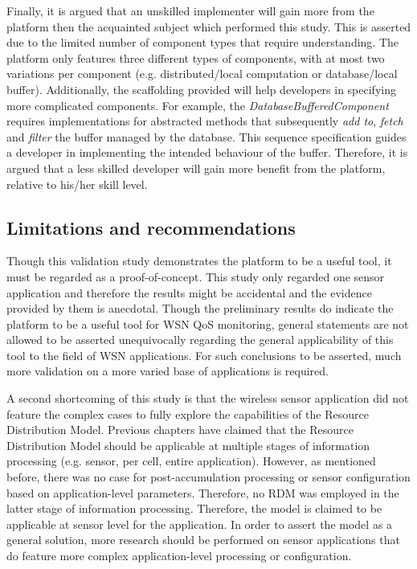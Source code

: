 Finally, it is argued that an unskilled implementer will gain more from the platform then the acquainted subject which performed this study. This is asserted due to the limited number of component types that require understanding. The platform only features three different types of components, with at most two variations per component (e.g. distributed/local computation or database/local buffer). Additionally, the scaffolding provided will help developers in specifying more complicated components. For example, the \emph{DatabaseBufferedComponent} requires implementations for abstracted methods that subsequently \emph{add to}, \emph{fetch} and \emph{filter} the buffer managed by the database. This sequence specification guides a developer in implementing the intended behaviour of the buffer. Therefore, it is argued that a less skilled developer will gain more benefit from the platform, relative to his/her skill level.

\subsection{Limitations and recommendations}
Though this validation study demonstrates the platform to be a useful tool, it must be regarded as a proof-of-concept. This study only regarded one sensor application and therefore the results might be accidental and the evidence provided by them is anecdotal. Though the preliminary results do indicate the platform to be a useful tool for WSN QoS monitoring, general statements are not allowed to be asserted unequivocally regarding the general applicability of this tool to the field of WSN applications. For such conclusions to be asserted, much more validation on a more varied base of applications is required.

A second shortcoming of this study is that the \sensit wireless sensor application did not feature the complex cases to fully explore the capabilities of the Resource Distribution Model. Previous chapters have claimed that the Resource Distribution Model should be applicable at multiple stages of information processing (e.g. sensor, per cell, entire application). However, as mentioned before, there was no case for post-accumulation processing or sensor configuration based on application-level parameters. Therefore, no RDM was employed in the latter stage of information processing. Therefore, the model is claimed to be applicable at sensor level for the \sensit application. In order to assert the model as a general solution, more research should be performed on sensor applications that do feature more complex application-level processing or configuration.

